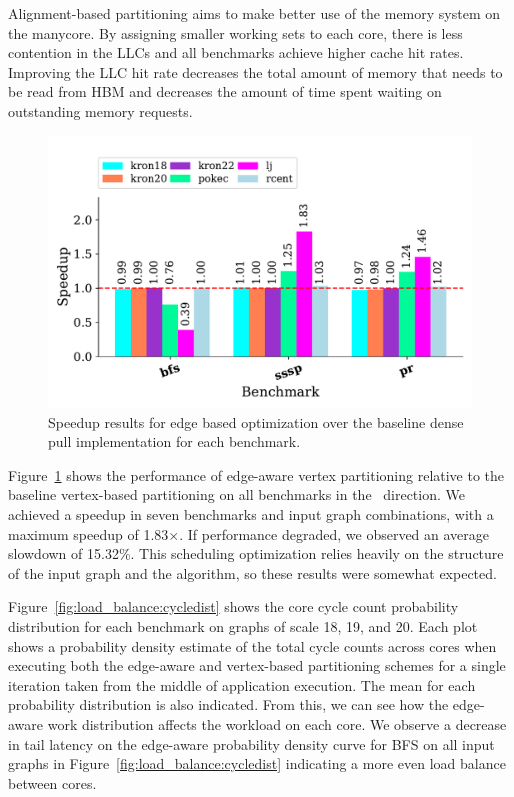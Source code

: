Alignment-based partitioning aims to make better use of the memory system on the manycore. 
By assigning smaller working sets to each core, there is less contention in the LLCs and all benchmarks achieve higher cache hit rates. 
Improving the LLC hit rate decreases the total amount of memory that needs to be read from HBM and decreases the amount of time spent waiting on outstanding memory requests.
 
 
\begin{figure}[h!]
    \centering
    \includegraphics[scale = 0.6]{graphit-figures/edge.pdf}
    \caption{Speedup results for edge based optimization over the baseline dense pull implementation for each benchmark.}
    \label{pap:generals:sec:eval:fig:edge}
\end{figure}

\edgeAwareHist
 
Figure~\ref{pap:generals:sec:eval:fig:edge} shows the performance of edge-aware vertex partitioning relative to the baseline vertex-based partitioning on all benchmarks in the \pull~direction. 
We achieved a speedup in seven benchmarks and input graph combinations, with a maximum speedup of 1.83$\times$.
If performance degraded, we observed an average slowdown of 15.32\%. 
This scheduling optimization relies heavily on the structure of the input graph and the algorithm, so these results were somewhat expected.

Figure~\ref{fig:load_balance:cycledist} shows the core cycle count probability distribution for each benchmark on \kron graphs of scale 18, 19, and 20.
Each plot shows a probability density estimate of the total cycle counts across cores when executing both the edge-aware and vertex-based partitioning schemes for a single iteration taken from the middle of application execution.
The mean for each probability distribution is also indicated.
From this, we can see how the edge-aware work distribution affects the workload on each core.
We observe a decrease in tail latency on the edge-aware probability density curve for BFS on all input graphs in Figure~\ref{fig:load_balance:cycledist} indicating a more even load balance between cores. 

